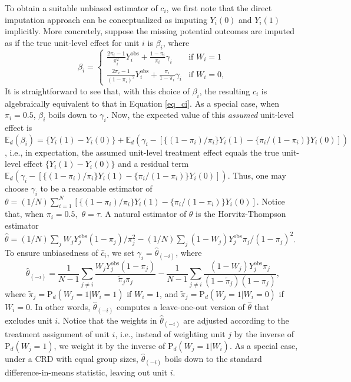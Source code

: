 \documentclass[12pt]{article}
\newcommand{\E}{{\mathbb{E}}}
\renewcommand{\Pr}{{\text{P}}}
\begin{document}
To obtain a suitable unbiased estimator of $c_i$, we first note that the direct imputation approach can be conceptualized as imputing $Y_i(0)$ and $Y_i(1)$ implicitly. More concretely, suppose the missing potential outcomes are imputed as if the true unit-level effect for unit $i$ is $\beta_i$, where
    \begin{equation}
 {\beta}_i =
    \begin{cases}
      \frac{2\pi_i - 1}{\pi^2_i} Y^{\text{obs}}_i + \frac{1-\pi_i}{\pi_i}\gamma_i & \text{if $W_i = 1$}\\
    \frac{2\pi_i - 1}{(1-\pi_i)^2} Y^{\text{obs}}_i + \frac{\pi_i}{1-\pi_i}\gamma_i & \text{if $W_i = 0$}, \label{eq_betai}
    \end{cases}       
\end{equation}
It is straightforward to see that, with this choice of $\beta_i$, the resulting $\hat{c}_i$ is algebraically equivalent to that in Equation \ref{eq_ci}. As a special case, when $\pi_i = 0.5$, $\beta_i$ boils down to $\gamma_i$. Now, the expected value of this \textit{assumed} unit-level effect is $\E_d(\beta_i) = \{Y_i(1) - Y_i(0)\} + \E_d(\gamma_i - [\{(1-\pi_i)/\pi_i\}Y_i(1) - \{\pi_i/(1-\pi_i)\}Y_i(0)])$, i.e., in expectation, the assumed unit-level treatment effect equals the true unit-level effect $\{Y_i(1)-Y_i(0)\}$ and a residual term $ \E_d(\gamma_i - [\{(1-\pi_i)/\pi_i\}Y_i(1) - \{\pi_i/(1-\pi_i)\}Y_i(0)])$. Thus, one may choose $\gamma_i$ to be a reasonable estimator of $\theta = (1/N)\sum_{i=1}^{N}\left[\{(1-\pi_i)/\pi_i\}Y_i(1) - \{\pi_i/(1-\pi_i)\}Y_i(0)\right].$
Notice that, when $\pi_i = 0.5,$ $\theta = \tau$. A natural estimator of $\theta$ is the Horvitz-Thompson estimator $\hat{\theta} = (1/N)\sum_{j}W_jY^{\text{obs}}_j(1-\pi_j)/{\pi^2_j} - (1/N)\sum_{j}{(1-W_j)Y^{\text{obs}}_j\pi_j}/{(1-\pi_j)^2}$. To ensure unbiasedness of $\hat{c}_i$, we set $\gamma_i = \hat{\theta}_{(-i)}$, where
\begin{equation}
    \hat{\theta}_{(-i)} = \frac{1}{N-1}\sum_{j\neq i}\frac{W_jY^{\text{obs}}_j(1-\pi_j)}{\tilde{\pi}_j \pi_j} - \frac{1}{N-1}\sum_{j\neq i}\frac{(1-W_j)Y^{\text{obs}}_j {\pi}_j}{(1-\tilde{\pi}_j)(1-\pi_j)}, \label{eq_jack3}
\end{equation}
where $\tilde{\pi}_j = \Pr_d(W_j = 1|W_i = 1)$ if $W_i = 1$, and $\tilde{\pi}_j = \Pr_d(W_j=1|W_i = 0)$ if $W_i = 0$. 
In other words, $\hat{\theta}_{(-i)}$ computes a leave-one-out version of $\hat{\theta}$ that excludes unit $i$.
Notice that the weights in $\hat{\theta}_{(-i)}$ are adjusted according to the treatment assignment of unit $i$, i.e., instead of weighting unit $j$ by the inverse of $\Pr_d(W_j = 1)$, we weight it by the inverse of $\Pr_d(W_j  = 1|W_i)$.
As a special case, under a CRD with equal group sizes, $\hat{\theta}_{(-i
)}$ boils down to the standard difference-in-means statistic, leaving out unit $i$.
\end{document}
